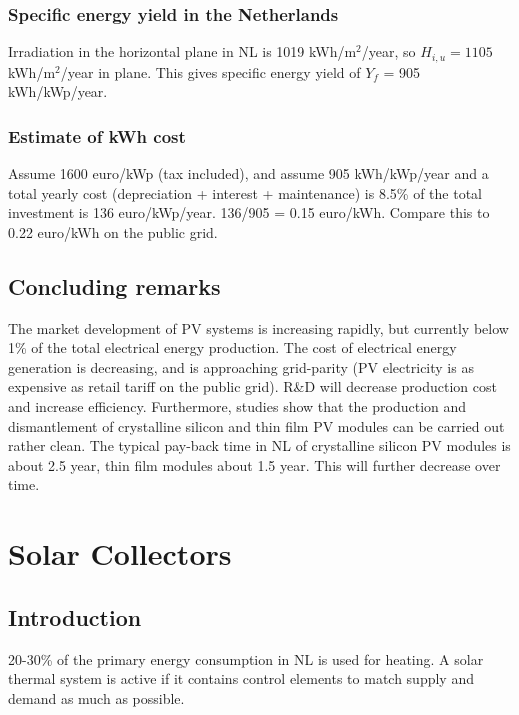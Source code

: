 \documentclass[a4paper,10pt]{article}
\begin{document}
\subsubsection{Specific energy yield in the Netherlands}
Irradiation in the horizontal plane in NL is 1019 kWh/m$^2$/year, so $H_{i,u} = 1105$ kWh/m$^2$/year in plane. This gives specific energy yield of $Y_f$ = 905 kWh/kWp/year.

\subsubsection{Estimate of kWh cost}
Assume 1600 euro/kWp (tax included), and assume 905 kWh/kWp/year and a total yearly cost (depreciation + interest + maintenance) is 8.5\% of the total investment is 136 euro/kWp/year. 136/905 = 0.15 euro/kWh. Compare this to 0.22 euro/kWh on the public grid.

\subsection{Concluding remarks}
The market development of PV systems is increasing rapidly, but currently below 1\% of the total electrical energy production. The cost of electrical energy generation is decreasing, and is approaching grid-parity (PV electricity is as expensive as retail tariff on the public grid). R\&D will decrease production cost and increase efficiency. Furthermore, studies show that the production and dismantlement of crystalline silicon and thin film PV modules can be carried out rather clean. The typical pay-back time in NL of crystalline silicon PV modules is about 2.5 year, thin film modules about 1.5 year. This will further decrease over time. 


\section{Solar Collectors}
\subsection{Introduction}
20-30\% of the primary energy consumption in NL is used for heating. A solar thermal system is active if it contains control elements to match supply and demand as much as possible.
\end{document}
